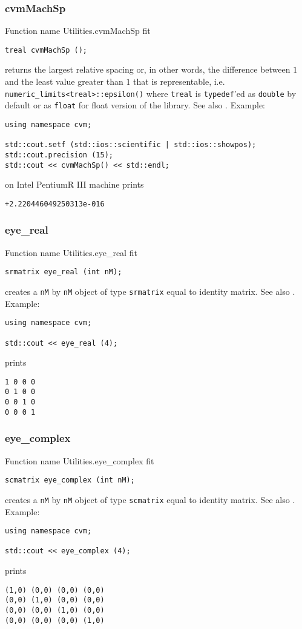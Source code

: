 \subsubsection{cvmMachSp}
Function%
\pdfdest name {Utilities.cvmMachSp} fit
\begin{verbatim}
treal cvmMachSp ();
\end{verbatim}
returns the largest relative spacing or, in other words,
the difference between $1$ and the least value greater 
than $1$ that is representable,
i.e. \verb"numeric_limits<treal>::epsilon()"
where \verb"treal" is \verb"typedef"'ed as \verb"double"
by default or as \verb"float" for float version of the library.
See also .
Example:
\begin{Verbatim}
using namespace cvm;

std::cout.setf (std::ios::scientific | std::ios::showpos);
std::cout.precision (15);
std::cout << cvmMachSp() << std::endl;
\end{Verbatim}
on Intel Pentium\textcircled{\scriptsize{R}} III machine prints
\begin{Verbatim}
+2.220446049250313e-016
\end{Verbatim}
\newpage


\subsubsection{eye\_real}
Function%
\pdfdest name {Utilities.eye_real} fit
\begin{verbatim}
srmatrix eye_real (int nM);
\end{verbatim}
creates a \verb"nM" by \verb"nM" object of type 
\verb"srmatrix" 
equal to identity matrix.
See also .
Example:
\begin{Verbatim}
using namespace cvm;

std::cout << eye_real (4);
\end{Verbatim}
prints
\begin{Verbatim}
1 0 0 0
0 1 0 0
0 0 1 0
0 0 0 1
\end{Verbatim}
\newpage



\subsubsection{eye\_complex}
Function%
\pdfdest name {Utilities.eye_complex} fit
\begin{verbatim}
scmatrix eye_complex (int nM);
\end{verbatim}
creates a \verb"nM" by \verb"nM" object of type 
\verb"scmatrix" 
equal to identity matrix.
See also .
Example:
\begin{Verbatim}
using namespace cvm;

std::cout << eye_complex (4);
\end{Verbatim}
prints
\begin{Verbatim}
(1,0) (0,0) (0,0) (0,0)
(0,0) (1,0) (0,0) (0,0)
(0,0) (0,0) (1,0) (0,0)
(0,0) (0,0) (0,0) (1,0)
\end{Verbatim}
\newpage


